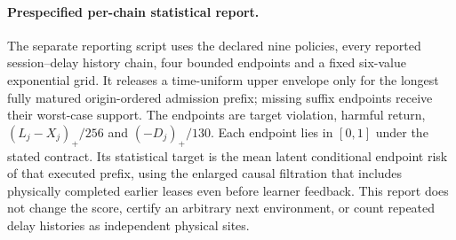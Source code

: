 \paragraph{Prespecified per-chain statistical report.}
The separate reporting script uses the declared nine policies, every
reported session--delay history chain, four bounded endpoints and a
fixed six-value exponential grid. It releases a time-uniform upper
envelope only for the longest fully matured origin-ordered admission
prefix; missing suffix endpoints receive their worst-case support.
The endpoints are target violation, harmful return,
$(L_j-X_j)_+/256$ and $(-D_j)_+/130$.
Each endpoint lies in $[0,1]$ under the stated contract. Its statistical
target is the mean latent conditional endpoint risk of that executed
prefix, using the enlarged causal filtration that includes physically
completed earlier leases even before learner feedback. This report
does not change the score, certify an arbitrary next environment, or
count repeated delay histories as independent physical sites.
